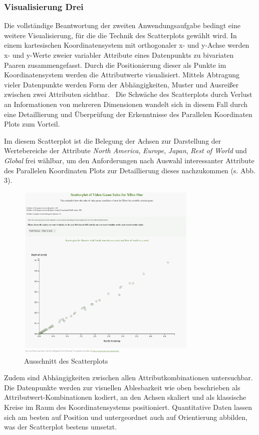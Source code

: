 \documentclass[usegeometry=true]{scrartcl}
\begin{document}
\subsubsection{Visualisierung Drei}
Die vollständige Beantwortung der zweiten Anwendungsaufgabe bedingt eine weitere Visualisierung, für die die Technik des Scatterplots gewählt wird.
In einem kartesischen Koordinatensystem mit orthogonaler x- und y-Achse werden x- und y-Werte 
zweier variabler Attribute eines Datenpunkts zu bivariaten Paaren zusammengefasst.
Durch die Positionierung dieser als Punkte im Koordinatensystem werden die Attributwerte visualisiert.\cite[103]{Friendly.2005}
Mittels Abtragung vieler Datenpunkte werden Form der Abhängigkeiten, Muster und Ausreißer zwischen zwei Attributen sichtbar.\cite[9]{Chan.2006}~\cite[103]{Friendly.2005}
Die Schwäche des Scatterplots durch Verlust an Informationen von mehreren Dimensionen wandelt sich in diesem Fall durch eine Detaillierung und Überprüfung der Erkenntnisse des Parallelen Koordinaten Plots zum Vorteil.\cite[9]{Chan.2006}~\cite[93]{Wegman.1997}

Im diesem Scatterplot ist die Belegung der Achsen zur Darstellung der Wertebereiche der Attribute \textit{North America}, \textit{Europe}, \textit{Japan}, \textit{Rest of World} und \textit{Global} frei wählbar, 
um den Anforderungen nach Auswahl interessanter Attribute des Parallelen Koordinaten Plots zur Detaillierung dieses nachzukommen (s. Abb. 3).
\begin{figure}[h]
        \centering
        \includegraphics[height=8.5cm]{Bilder/Scatterplot_full.png}
        \caption{Ausschnitt des Scatterplots}
        \label{fig:Scatterplot}
\end{figure}
Zudem sind Abhängigkeiten zwischen allen Attributkombinationen untersuchbar. 
Die Datenpunkte werden zur visuellen Ablesbarkeit wie oben beschrieben als Attributwert-Kombinationen kodiert, 
an den Achsen skaliert und als klassische Kreise im Raum des Koordinatensystems positioniert. 
Quantitative Daten lassen sich am besten auf Position und untergeordnet auch auf Orientierung abbilden, 
was der Scatterplot bestens umsetzt.\cite{Bertin.1982}
\end{document}
